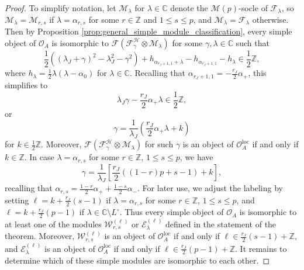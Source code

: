 \documentclass[11pt, reqno]{amsart}
\theoremstyle{definition}\newtheorem{defi}[thm]{Definition}
\theoremstyle{definition}\newtheorem{rem}[thm]{Remark}
\theoremstyle{definition}\newtheorem{exam}[thm]{Example}
\theoremstyle{definition}\newtheorem{assum}[thm]{Assumption}
\newcommand{\cE}{\mathcal{E}}
\newcommand{\cH}{\mathcal{H}}
\newcommand{\cM}{\mathcal{M}}
\newcommand{\cF}{\mathcal{F}}
\newcommand{\cO}{\mathcal{O}}
\newcommand{\cW}{\mathcal{W}}
\newcommand{\CC}{\mathbb{C}}
\newcommand{\ZZ}{\mathbb{Z}}
\newcommand{\Oloc}{\cO^{\mathrm{loc}}}
\begin{document}
\begin{proof}
To simplify notation, let $\cM_\lambda$ for $\lambda\in\CC$ denote the $\cM(p)$-socle of $\cF_\lambda$, so $\cM_\lambda=\cM_{r,s}$ if $\lambda=\alpha_{r,s}$ for some $r\in\ZZ$ and $1\leq s\leq p$, and $\cM_\lambda=\cF_\lambda$ otherwise. Then by Proposition \ref{prop:general_simple_module_classification}, every simple object of $\cO_A$ is isomorphic to $\cF(\cF^\cH_\gamma\otimes\cM_\lambda)$ for some $\gamma,\lambda\in\CC$ such that 
\begin{equation*}
\frac{1}{2}((\lambda_J+\gamma)^2-\lambda_J^2-\gamma^2)+h_{\alpha_{r_J+1,1}+\lambda}-h_{\alpha_{r_J+1,1}}-h_\lambda\in\frac{1}{2}\ZZ,
\end{equation*}
where $h_\lambda=\frac{1}{2}\lambda(\lambda-\alpha_0)$ for $\lambda\in\CC$. Recalling that $\alpha_{r_J+1,1}=-\frac{r_J}{2}\alpha_+$, this simplifies to 
\begin{equation*}
\lambda_J\gamma-\frac{r_J}{2}\alpha_+\lambda\in\frac{1}{2}\ZZ,
\end{equation*}
or
\begin{equation*}
\gamma = \frac{1}{\lambda_J}\left(\frac{r_J}{2}\alpha_+\lambda +k\right)
\end{equation*}
for $k\in\frac{1}{2}\ZZ$. Moreover, $\cF(\cF^\cH_\gamma\otimes\cM_\lambda)$ for such $\gamma$ is an object of $\Oloc_A$ if and only if $k\in \ZZ$. In case $\lambda=\alpha_{r,s}$ for some $r\in\ZZ$, $1\leq s\leq p$, we have
\begin{equation*}
\gamma=\frac{1}{\lambda_J}\left[\frac{r_J}{2}((1-r) p+s-1)+k\right],
\end{equation*}
recalling that $\alpha_{r,s}=\frac{1-r}{2}\alpha_++\frac{1-s}{2}\alpha_-$. For later use, we adjust the labeling by setting $\ell=k+\frac{r_J}{2}(s-1)$ if $\lambda=\alpha_{r,s}$ for some $r\in\ZZ$, $1\leq s\leq p$, and $\ell=k+\frac{r_J}{2}(p-1)$ if $\lambda\in\CC\setminus L^\circ$. Thus every simple object of $\cO_A$ is isomorphic to at least one of the modules $\cW^{(\ell)}_{r,s}$ or $\cE^{(\ell)}_\lambda$ defined in the statement of the  theorem. Moreover, $\cW_{r,s}^{(\ell)}$ is an object of $\Oloc_A$ if and only if $\ell\in \frac{r_J}{2}(s-1)+\ZZ$, and $\cE_\lambda^{(\ell)}$ is an object of $\Oloc_A$ if and only if $\ell\in \frac{r_J}{2}(p-1)+\ZZ$. It remains to determine which of these simple modules are isomorphic to each other.


\end{proof}
\end{document}
